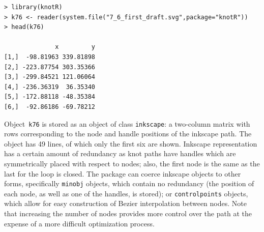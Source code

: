 \documentclass{birkjour}
\theoremstyle{definition}
\theoremstyle{remark}
\numberwithin{equation}{section}
\begin{document}
\begin{verbatim}
> library(knotR)
> k76 <- reader(system.file("7_6_first_draft.svg",package="knotR"))
> head(k76)

              x         y
[1,]  -98.81963 339.81898
[2,] -223.87754 303.35366
[3,] -299.84521 121.06064
[4,] -236.36319  36.35340
[5,] -172.88118 -48.35384
[6,]  -92.86186 -69.78212
\end{verbatim}

Object~{\tt k76} is stored as an object of class {\tt inkscape}: a
two-column matrix with rows corresponding to the node and handle
positions of the inkscape path.   The object has 49 lines, of which only the  first six are shown.  Inkscape representation has a certain amount of
redundancy as knot paths have handles which are symmetrically placed
with respect to nodes; also, the first node is the same as the last
for the loop is closed.  The package can coerce inkscape objects to
other forms, specifically {\tt minobj} objects, which contain no
redundancy (the position of each node, as well as one of the handles,
is stored); or {\tt controlpoints} objects, which allow for easy
construction of Bezier interpolation between nodes.  Note that increasing the number of nodes provides more control over the path at the expense of a more difficult optimization process.
\end{document}

